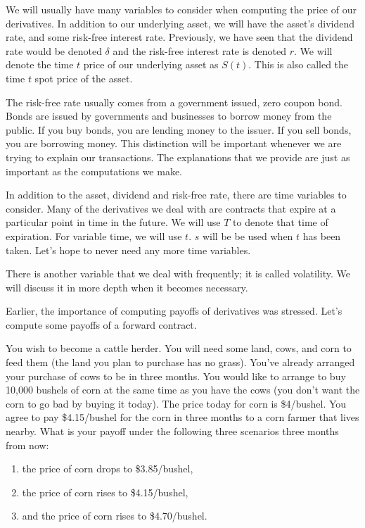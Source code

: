 \documentclass{ximera}
\begin{document}
We will usually have many variables to consider when computing the price of our derivatives. In addition to our underlying asset, we will have the asset's dividend rate, and some risk-free interest rate. Previously, we have seen that the dividend rate would be denoted $\delta$ and the risk-free interest rate is denoted $r$. We will denote the time $t$ price of our underlying asset as $S(t)$. This is also called the time $t$ spot price of the asset. 

The risk-free rate usually comes from a government issued, zero coupon bond. Bonds are issued by governments and businesses to borrow money from the public. If you buy bonds, you are lending money to the issuer. If you sell bonds, you are borrowing money. This distinction will be important whenever we are trying to explain our transactions. The explanations that we provide are just as important as the computations we make.

In addition to the asset, dividend and risk-free rate, there are time variables to consider. Many of the derivatives we deal with are contracts that expire at a particular point in time in the future. We will use $T$ to denote that time of expiration. For variable time, we will use $t$. $s$ will be be used when $t$ has been taken. Let's hope to never need any more time variables. 

There is another variable that we deal with frequently; it is called volatility. We will discuss it in more depth when it becomes necessary. 

Earlier, the importance of computing payoffs of derivatives was stressed. Let's compute some payoffs of a forward contract.

\begin{example}
You wish to become a cattle herder. You will need some land, cows, and corn to feed them (the land you plan to purchase has no grass). You've already arranged your purchase of cows to be in three months. You would like to arrange to buy 10,000 bushels of corn at the same time as you have the cows (you don't want the corn to go bad by buying it today). The price today for corn is \$4/bushel. You agree to pay \$4.15/bushel for the corn in three months to a corn farmer that lives nearby. What is your payoff under the following three scenarios three months from now:
	\begin{enumerate}
	\item the price of corn drops to \$3.85/bushel,
	\item the price of corn rises to \$4.15/bushel,
	\item and the price of corn rises to \$4.70/bushel.
	\end{enumerate}
\end{example}
\end{document}
